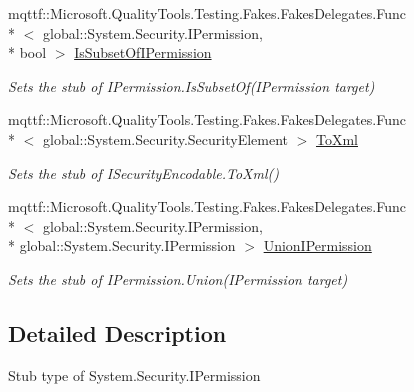 \begin{DoxyCompactItemize}
mqttf\-::\-Microsoft.\-Quality\-Tools.\-Testing.\-Fakes.\-Fakes\-Delegates.\-Func\\*
$<$ global\-::\-System.\-Security.\-I\-Permission, \\*
bool $>$ \hyperlink{class_system_1_1_security_1_1_fakes_1_1_stub_i_permission_a7ab0db421eaa56b1f2613289b629c534}{Is\-Subset\-Of\-I\-Permission}
\begin{DoxyCompactList}\small\item\em Sets the stub of I\-Permission.\-Is\-Subset\-Of(\-I\-Permission target)\end{DoxyCompactList}\item 
mqttf\-::\-Microsoft.\-Quality\-Tools.\-Testing.\-Fakes.\-Fakes\-Delegates.\-Func\\*
$<$ global\-::\-System.\-Security.\-Security\-Element $>$ \hyperlink{class_system_1_1_security_1_1_fakes_1_1_stub_i_permission_a9b96e9d5486d129ca21242f50beadb0b}{To\-Xml}
\begin{DoxyCompactList}\small\item\em Sets the stub of I\-Security\-Encodable.\-To\-Xml()\end{DoxyCompactList}\item 
mqttf\-::\-Microsoft.\-Quality\-Tools.\-Testing.\-Fakes.\-Fakes\-Delegates.\-Func\\*
$<$ global\-::\-System.\-Security.\-I\-Permission, \\*
global\-::\-System.\-Security.\-I\-Permission $>$ \hyperlink{class_system_1_1_security_1_1_fakes_1_1_stub_i_permission_a643c6bc7d2f7bf5f497b780155d1f951}{Union\-I\-Permission}
\begin{DoxyCompactList}\small\item\em Sets the stub of I\-Permission.\-Union(\-I\-Permission target)\end{DoxyCompactList}\end{DoxyCompactItemize}


\subsection{Detailed Description}
Stub type of System.\-Security.\-I\-Permission



